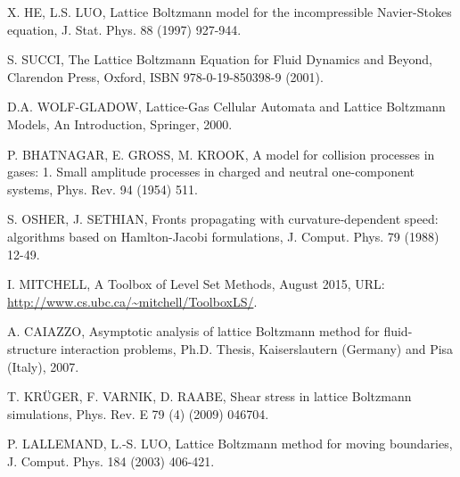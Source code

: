\documentclass[final,leqno,onefignum,onetabnum]{siamltexmm}
\begin{document}
\begin{thebibliography}{1}
 {\sc X. HE, L.S. LUO}, Lattice Boltzmann model for the incompressible Navier-Stokes equation, J. Stat. Phys. 88 (1997) 927-944.

 {\sc S. SUCCI}, The Lattice Boltzmann Equation for Fluid Dynamics and Beyond, Clarendon Press, Oxford, ISBN 978-0-19-850398-9 (2001).

 {\sc D.A. WOLF-GLADOW}, Lattice-Gas Cellular Automata and Lattice Boltzmann Models, An Introduction, Springer, 2000.

 {\sc P. BHATNAGAR, E. GROSS, M. KROOK}, A model for collision processes in gases: 1. Small amplitude processes in charged and neutral one-component systems, Phys. Rev. 94 (1954) 511.

 {\sc S. OSHER, J. SETHIAN}, Fronts propagating with curvature-dependent speed: algorithms based on Hamlton-Jacobi formulations, J. Comput. Phys. 79 (1988) 12-49.

I. MITCHELL, A Toolbox of Level Set Methods, August 2015, URL: \url{http://www.cs.ubc.ca/~mitchell/ToolboxLS/}.

 {\sc A. CAIAZZO}, Asymptotic analysis of lattice Boltzmann method for fluid-structure interaction problems, Ph.D. Thesis, Kaiserslautern (Germany) and Pisa (Italy), 2007.

 {\sc T. KR\"UGER, F. VARNIK, D. RAABE}, Shear stress in lattice Boltzmann simulations, Phys. Rev. E 79 (4) (2009) 046704.

 {\sc P. LALLEMAND, L.-S. LUO}, Lattice Boltzmann method for moving boundaries, J. Comput. Phys. 184 (2003) 406-421.

\end{thebibliography}
\end{document}
